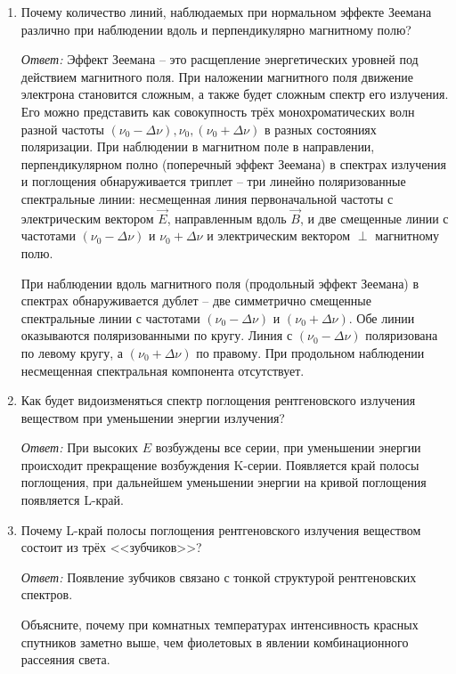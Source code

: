 \begin{enumerate}
\item Почему количество линий, наблюдаемых при нормальном эффекте Зеемана
различно при наблюдении вдоль и перпендикулярно магнитному полю?

\emph{Ответ:}
Эффект Зеемана -- это расщепление энергетических уровней под действием
магнитного поля. При наложении магнитного поля движение электрона становится
сложным, а также будет сложным спектр его излучения. Его можно представить как
совокупность трёх монохроматических волн разной частоты \( (\nu_0 - \Delta \nu),
\nu_0, (\nu_0 + \Delta \nu) \) в разных состояниях поляризации. При наблюдении в
магнитном поле в направлении, перпендикулярном полно (поперечный эффект Зеемана)
в спектрах излучения и поглощения обнаруживается триплет -- три линейно
поляризованные спектральные линии: несмещенная линия первоначальной частоты
с электрическим вектором \( \vec{E} \), направленным вдоль \( \vec{B} \), и две
смещенные линии с частотами \( (\nu_0 - \Delta \nu) \) и \( \nu_0 + \Delta \nu\)
и электрическим вектором \( \perp \) магнитному полю.

При наблюдении вдоль магнитного поля (продольный эффект Зеемана) в спектрах
обнаруживается дублет -- две симметрично смещенные спектральные линии с
частотами \( (\nu_0 - \Delta \nu) \) и \( (\nu_0 + \Delta \nu) \). Обе линии
оказываются поляризованными по кругу. Линия с \( (\nu_0 - \Delta \nu) \)
поляризована по левому кругу, а \( (\nu_0 + \Delta \nu) \) по правому. При
продольном наблюдении несмещенная спектральная компонента отсутствует.

\item Как будет видоизменяться спектр поглощения рентгеновского излучения
веществом при уменьшении энергии излучения?

\emph{Ответ:}
При высоких \( E \) возбуждены все серии, при уменьшении энергии происходит
прекращение возбуждения K-серии. Появляется край полосы поглощения, при
дальнейшем уменьшении энергии на кривой поглощения появляется L-край.

\item Почему L-край полосы поглощения рентгеновского излучения веществом
состоит из трёх <<зубчиков>>?

\emph{Ответ:}
Появление зубчиков связано с тонкой структурой рентгеновских спектров.

Объясните, почему при комнатных температурах интенсивность красных спутников
заметно выше, чем фиолетовых в явлении комбинационного рассеяния света.
        

\end{enumerate}
